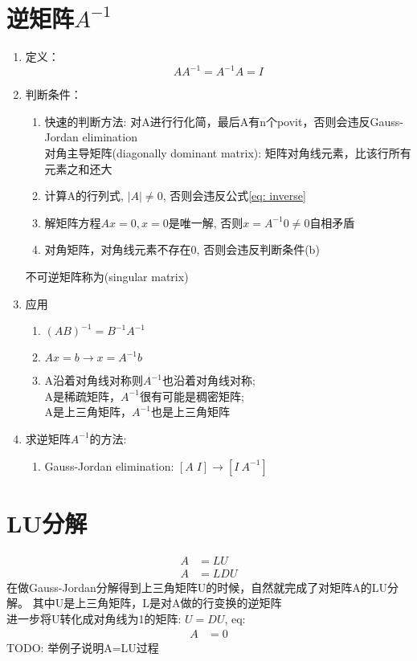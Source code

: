 \documentclass{book}
\begin{document}
\section{逆矩阵$A^{-1}$}
\begin{enumerate}
  \item 定义：
    \begin{equation}
      AA^{-1}=A^{-1}A=I
      \label{eq: inverse}
    \end{equation}
  \item 判断条件：
    \begin{enumerate}
      \item 快速的判断方法: 对A进行行化简，最后A有n个povit，否则会违反Gauss-Jordan elimination\\ 
        对角主导矩阵(diagonally dominant matrix): 矩阵对角线元素，比该行所有元素之和还大
      \item 计算A的行列式, $\vert A\vert\neq 0$, 否则会违反公式\ref{eq: inverse}
      \item 解矩阵方程$Ax=0, x=0$是唯一解, 否则$x=A^{-1}0\neq 0$自相矛盾
      \item 对角矩阵，对角线元素不存在0, 否则会违反判断条件(b)
    \end{enumerate}
    不可逆矩阵称为(singular matrix)
  \item 应用
    \begin{enumerate}
      \item $(AB)^{-1}=B^{-1}A^{-1}$ 
      \item $Ax=b\rightarrow x=A^{-1}b$
      \item A沿着对角线对称则$A^{-1}$也沿着对角线对称;\\ 
            A是稀疏矩阵，$A^{-1}$很有可能是稠密矩阵;\\ 
            A是上三角矩阵，$A^{-1}$也是上三角矩阵
    \end{enumerate}
  \item 求逆矩阵$A^{-1}$的方法:
    \begin{enumerate}
      \item Gauss-Jordan elimination: $\left[A \; I\right]\rightarrow [I \: A^{-1}]$
    \end{enumerate}
\end{enumerate}
\section{LU分解}
\begin{equation}
  \begin{aligned}
    A&=LU\\ 
    A&=LDU
  \end{aligned}
  \label{eq: LU1}
\end{equation}
在做Gauss-Jordan分解得到上三角矩阵U的时候，自然就完成了对矩阵A的LU分解。
其中U是上三角矩阵，L是对A做的行变换的逆矩阵\\ 
进一步将U转化成对角线为1的矩阵: $U=DU$, eq:
\begin{equation*}
  \begin{aligned}
    A&= 0
  \end{aligned}
  \label{eq: LU2}
\end{equation*}
TODO: 举例子说明A=LU过程
\end{document}
